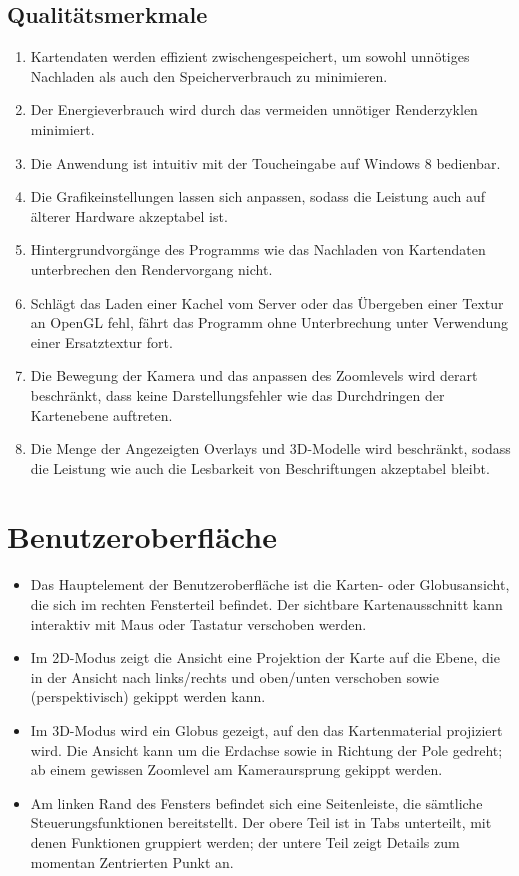 \documentclass[10pt]{scrreprt}
\begin{document}
\section{Qualitätsmerkmale}

\begin{enumerate}[leftmargin=2cm,resume]
\item Kartendaten werden effizient zwischengespeichert, um sowohl unnötiges Nachladen als auch den Speicherverbrauch zu minimieren.
\item \W Der Energieverbrauch wird durch das vermeiden unnötiger Renderzyklen minimiert.
\item \W Die Anwendung ist intuitiv mit der Toucheingabe auf Windows 8 bedienbar.
\item \W Die Grafikeinstellungen lassen sich anpassen, sodass die Leistung auch auf älterer Hardware akzeptabel ist.
\item Hintergrundvorgänge des Programms wie das Nachladen von Kartendaten unterbrechen den Rendervorgang nicht.
\item Schlägt das Laden einer Kachel vom Server oder das Übergeben einer Textur an OpenGL fehl, fährt das Programm ohne Unterbrechung unter Verwendung einer Ersatztextur fort.
\item Die Bewegung der Kamera und das anpassen des Zoomlevels wird derart beschränkt, dass keine Darstellungsfehler wie das Durchdringen der Kartenebene auftreten.
\item \W Die Menge der Angezeigten Overlays und 3D-Modelle wird beschränkt, sodass die Leistung wie auch die Lesbarkeit von Beschriftungen akzeptabel bleibt.
\end{enumerate}




\chapter{Benutzeroberfläche}

\begin{itemize}
	\item Das Hauptelement der Benutzeroberfläche ist die Karten- oder Globusansicht, die sich im rechten Fensterteil befindet. Der sichtbare Kartenausschnitt kann interaktiv mit Maus oder Tastatur verschoben werden.
	\item Im 2D-Modus zeigt die Ansicht eine Projektion der Karte auf die Ebene, die in der Ansicht nach links/rechts und oben/unten verschoben sowie (perspektivisch) gekippt werden kann.
	\item Im 3D-Modus wird ein Globus gezeigt, auf den das Kartenmaterial projiziert wird. Die Ansicht kann um die Erdachse sowie in Richtung der Pole gedreht; ab einem gewissen Zoomlevel am Kameraursprung gekippt werden.
	\item Am linken Rand des Fensters befindet sich eine Seitenleiste, die sämtliche Steuerungsfunktionen bereitstellt. Der obere Teil ist in Tabs unterteilt, mit denen Funktionen gruppiert werden; der untere Teil zeigt Details zum momentan Zentrierten Punkt an.
\end{itemize}
\end{document}
